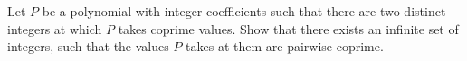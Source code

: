 Let $ P$ be a polynomial with integer coefficients such that there are two distinct integers at which $ P$ takes coprime values. Show that there exists an inﬁnite set of integers, such that the values $ P$ takes at them are pairwise coprime.